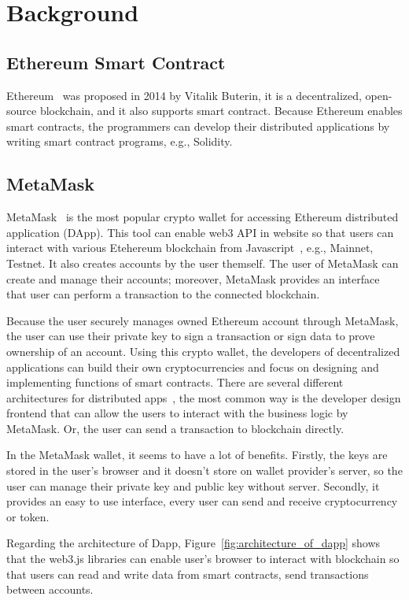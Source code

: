 \chapter{Background}
\label{chapter:background}

\section{Ethereum Smart Contract}
Ethereum~\cite{buterin2014next} was proposed in 2014 by Vitalik Buterin, it is a decentralized, open-source blockchain, and it also supports smart contract. Because Ethereum enables smart contracts, the programmers can develop their distributed applications by writing smart contract programs, e.g., Solidity. 

\newpage
\section{MetaMask}
MetaMask~\cite{metamask} is the most popular crypto wallet for accessing Ethereum distributed application (DApp). This tool can enable web3 API in website so that users can interact with various Etehereum blockchain from Javascript~\cite{web3.js}, e.g., Mainnet, Testnet. It also creates accounts by the user themself. The user of MetaMask can create and manage their accounts; moreover, MetaMask provides an interface that user can perform a transaction to the connected blockchain.\par
Because the user securely manages owned Ethereum account through MetaMask, the user can use their private key to sign a transaction or sign data to prove ownership of an account. Using this crypto wallet, the developers of decentralized applications can build their own cryptocurrencies and focus on designing and implementing functions of smart contracts. There are several different architectures for distributed apps~\cite{wessling2018engineering}, the most common way is the developer design frontend that can allow the users to interact with the business logic by MetaMask. Or, the user can send a transaction to blockchain directly.\par
In the MetaMask wallet, it seems to have a lot of benefits. Firstly, the keys are stored in the user's browser and it doesn't store on wallet provider's server, so the user can manage their private key and public key without server. Secondly, it provides an easy to use interface, every user can send and receive cryptocurrency or token.\par
Regarding the architecture of Dapp, Figure~\ref{fig:architecture_of_dapp} shows that the web3.js libraries can enable user's browser to interact with blockchain so that users can read and write data from smart contracts, send transactions between accounts. 


